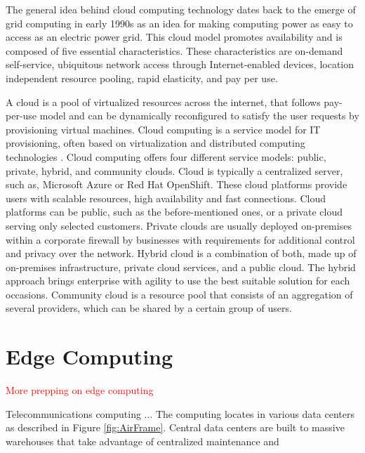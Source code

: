 The general idea behind cloud computing technology dates back to the emerge of grid computing in early 1990s as an idea for making computing power as easy to access as an electric power grid. This cloud model promotes availability and is composed of five essential characteristics. These characteristics are on-demand self-service, ubiquitous network access through Internet-enabled devices, location independent resource pooling, rapid elasticity, and pay per use. \cite{Xing2012}

A cloud is a pool of virtualized resources across the internet, that follows pay-per-use model and can be dynamically reconfigured to satisfy the user requests by provisioning virtual machines. Cloud computing is a service model for IT provisioning, often based on virtualization and distributed computing technologies \cite{Lombardi2011}. Cloud computing offers four different service models: public, private, hybrid, and community clouds. Cloud is typically a centralized server, such as, Microsoft Azure or Red Hat OpenShift. These cloud platforms provide users with scalable resources, high availability and fast connections. Cloud platforms can be public, such as the before-mentioned ones, or a private cloud serving only selected customers. Private clouds are usually deployed on-premises within a corporate firewall by businesses with requirements for additional control and privacy over the network. Hybrid cloud is a combination of both, made up of on-premises infrastructure, private cloud services, and a public cloud. The hybrid approach brings enterprise with agility to use the best suitable solution for each occasions. \cite{NetApp} Community cloud is a resource pool that consists of an aggregation of several providers, which can be shared by a certain group of users. \cite{Taleb2017}\cite{MicrosoftAzure}\cite{Xing2012}




\section{Edge Computing}
\textcolor{red}{More prepping on edge computing}

Telecommunications computing ... The computing locates in various data centers as described in Figure \ref{fig:AirFrame}. Central data centers are built to massive warehouses that take advantage of centralized maintenance and 

